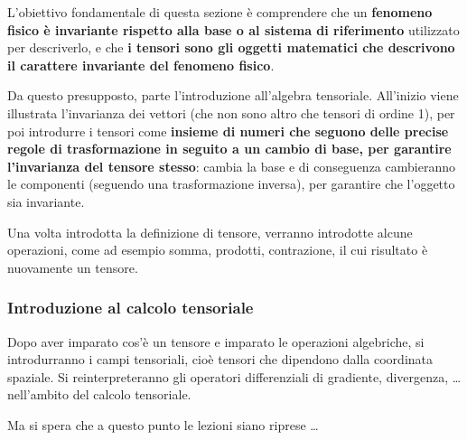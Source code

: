 \documentclass[11pt,fleqn]{article}
\begin{document}
L'obiettivo fondamentale di questa sezione è comprendere che un \textbf{fenomeno fisico è invariante rispetto alla base o al sistema di riferimento} utilizzato per descriverlo, e che \textbf{i tensori sono gli oggetti matematici che descrivono il carattere invariante del fenomeno fisico}.

Da questo presupposto, parte l'introduzione all'algebra tensoriale. All'inizio viene illustrata l'invarianza dei vettori (che non sono altro che tensori di ordine 1), per poi introdurre i tensori come \textbf{insieme di numeri che seguono delle precise regole di trasformazione in seguito a un cambio di base, per garantire l'invarianza del tensore stesso}: cambia la base e di conseguenza cambieranno le componenti (seguendo una trasformazione inversa), per garantire che l'oggetto sia invariante.

Una volta introdotta la definizione di tensore, verranno introdotte alcune operazioni, come ad esempio somma, prodotti, contrazione, il cui risultato è nuovamente un tensore.

\subsubsection*{Introduzione al calcolo tensoriale}
Dopo aver imparato cos'è un tensore e imparato le operazioni algebriche, si introdurranno i campi tensoriali, cioè tensori che dipendono dalla coordinata spaziale. Si reinterpreteranno gli operatori differenziali di gradiente, divergenza, \dots nell'ambito del calcolo tensoriale.

\vspace{0.5cm}
\noindent
Ma si spera che a questo punto le lezioni siano riprese \dots
\end{document}

